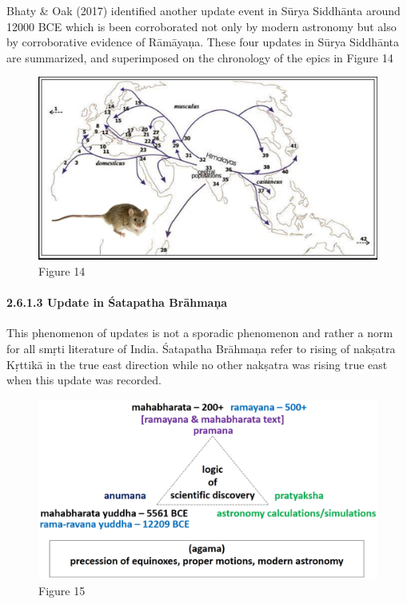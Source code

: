 Bhaty \& Oak (2017) identified another update event in Sūrya Siddhānta around 12000 BCE which is been corroborated not only by modern astronomy but also by corroborative evidence of Rāmāyaņa. These four updates in Sūrya Siddhānta are summarized, and superimposed on the chronology of the epics in Figure 14

\begin{figure}
\includegraphics{"images/8-14.jpg"}
\caption{Figure 14}
\end{figure}


\paragraph{2.6.1.3 Update in Śatapatha Brāhmaņa}

This phenomenon of updates is not a sporadic phenomenon and rather a norm for all smṛti literature of India. Śatapatha Brāhmaņa refer to rising of nakṣatra Kṛttikā in the true east direction while no other nakṣatra was rising true east when this update was recorded.

\begin{figure}
\includegraphics{"images/8-15.jpg"}
\caption{Figure 15}
\end{figure}

